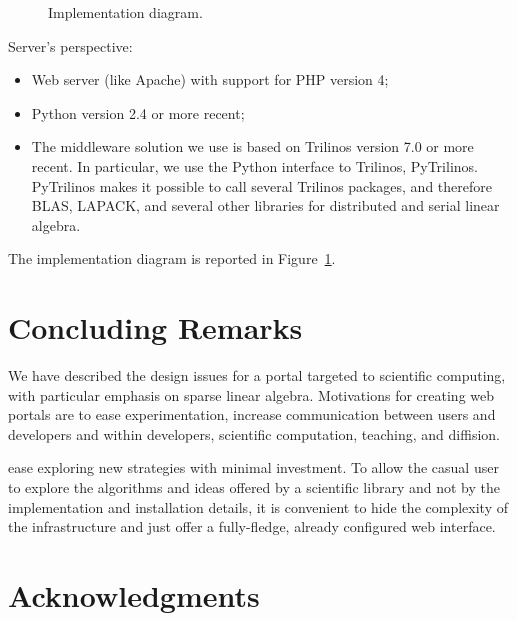 \documentclass[11pt,relax]{SANDreport}
\begin{document}
\begin{figure}
\begin{center}
\caption{Implementation diagram.}
\label{fig:design}
\end{center}
\end{figure}

Server's perspective:
\begin{itemize}
\item Web server (like Apache) with support for PHP version 4;
\item Python version 2.4 or more recent;
\item 
The middleware solution we use is based on Trilinos version 7.0 or more
recent. In particular, we use the Python interface to Trilinos, PyTrilinos.
PyTrilinos makes it possible to call several Trilinos packages, and therefore
BLAS, LAPACK, and several other libraries for distributed and serial linear
algebra.
\end{itemize}
The implementation diagram is reported in Figure~\ref{fig:design}.
  
\section{Concluding Remarks}
\label{sec:concluding}

We have described the design issues for a portal targeted to scientific
computing, with particular emphasis on sparse linear algebra. Motivations for
creating web portals are to ease experimentation, increase communication
between users and developers and within developers, scientific computation,
teaching, and diffision.

ease exploring new strategies with minimal investment. To allow the
casual user to explore the algorithms and ideas offered by a scientific
library and not by the implementation and installation details, it is
convenient to hide the complexity of the infrastructure and just offer a
fully-fledge, already configured web interface.

\section*{Acknowledgments}




\end{document}
